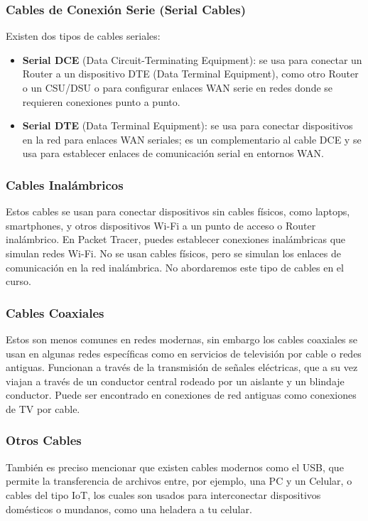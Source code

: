 \documentclass{article}
\begin{document}
\subsubsection{Cables de Conexión Serie (Serial Cables)}
Existen dos tipos de cables seriales: 
\begin{itemize}
    \item \textbf{Serial DCE} (Data Circuit-Terminating Equipment): se usa para conectar un Router a un dispositivo DTE (Data Terminal Equipment), como otro Router o un CSU/DSU o para configurar enlaces WAN serie en redes donde se requieren conexiones punto a punto.
    \item \textbf{Serial DTE} (Data Terminal Equipment): se usa para conectar dispositivos en la red para enlaces WAN seriales; es un complementario al cable DCE y se usa para establecer enlaces de comunicación serial en entornos WAN.
\end{itemize}


\subsubsection{Cables Inalámbricos}
Estos cables se usan para conectar dispositivos sin cables físicos, como laptops, smartphones, y otros dispositivos Wi-Fi a un punto de acceso o Router inalámbrico. En Packet Tracer, puedes establecer conexiones inalámbricas que simulan redes Wi-Fi. No se usan cables físicos, pero se simulan los enlaces de comunicación en la red inalámbrica. No abordaremos este tipo de cables en el curso.

\subsubsection{Cables Coaxiales}
Estos son menos comunes en redes modernas, sin embargo los cables coaxiales se usan en algunas redes específicas como en servicios de televisión por cable o redes antiguas. Funcionan a través de la transmisión de señales eléctricas, que a su vez viajan a través de un conductor central rodeado por un aislante y un blindaje conductor. Puede ser encontrado en conexiones de red antiguas como conexiones de TV por cable.

\subsubsection{Otros Cables}
También es preciso mencionar que existen cables modernos como el USB, que permite la transferencia de archivos entre, por ejemplo, una PC y un Celular, o cables del tipo IoT, los cuales son usados para interconectar dispositivos domésticos o mundanos, como una heladera a tu celular. 
\end{document}
